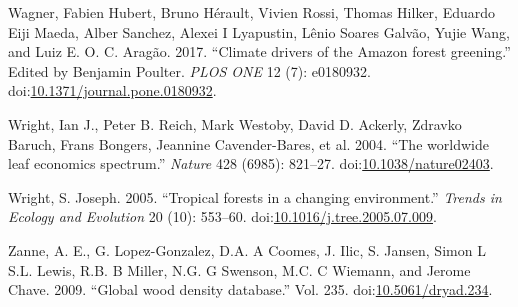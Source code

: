 \documentclass[]{elsarticle} %
\begin{document}
\hypertarget{ref-Wagner2017}{}
Wagner, Fabien Hubert, Bruno Hérault, Vivien Rossi, Thomas Hilker,
Eduardo Eiji Maeda, Alber Sanchez, Alexei I Lyapustin, Lênio Soares
Galvão, Yujie Wang, and Luiz E. O. C. Aragão. 2017. ``Climate drivers of
the Amazon forest greening.'' Edited by Benjamin Poulter. \emph{PLOS
ONE} 12 (7): e0180932.
doi:\href{https://doi.org/10.1371/journal.pone.0180932}{10.1371/journal.pone.0180932}.

\hypertarget{ref-Wright2004}{}
Wright, Ian J., Peter B. Reich, Mark Westoby, David D. Ackerly, Zdravko
Baruch, Frans Bongers, Jeannine Cavender-Bares, et al. 2004. ``The
worldwide leaf economics spectrum.'' \emph{Nature} 428 (6985): 821--27.
doi:\href{https://doi.org/10.1038/nature02403}{10.1038/nature02403}.

\hypertarget{ref-Wright2005}{}
Wright, S. Joseph. 2005. ``Tropical forests in a changing environment.''
\emph{Trends in Ecology and Evolution} 20 (10): 553--60.
doi:\href{https://doi.org/10.1016/j.tree.2005.07.009}{10.1016/j.tree.2005.07.009}.

\hypertarget{ref-Zanne2009}{}
Zanne, A. E., G. Lopez-Gonzalez, D.A. A Coomes, J. Ilic, S. Jansen,
Simon L S.L. Lewis, R.B. B Miller, N.G. G Swenson, M.C. C Wiemann, and
Jerome Chave. 2009. ``Global wood density database.'' Vol. 235.
doi:\href{https://doi.org/10.5061/dryad.234}{10.5061/dryad.234}.
\end{document}

